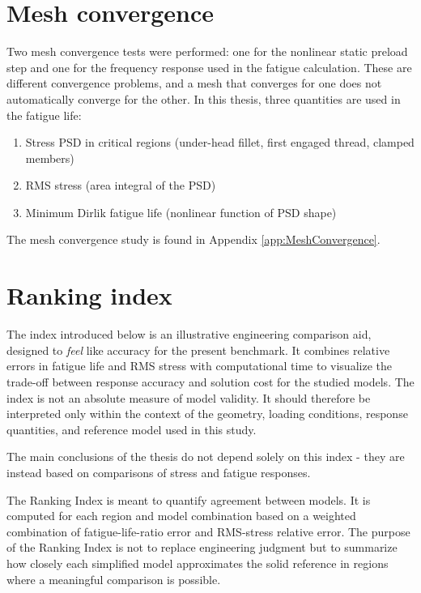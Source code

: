 \documentclass[a4paper,twoside]{bth}
\begin{document}
\section{Mesh convergence}
Two mesh convergence tests were performed: one for the nonlinear static preload step and one for the frequency response used in the fatigue calculation. These are different convergence problems, and a mesh that converges for one does not automatically converge for the other. In this thesis, three quantities are used in the fatigue life:
\begin{enumerate}
    \item Stress \ac{PSD} in critical regions (under-head fillet, first engaged thread, clamped members)
    \item \ac{RMS} stress (area integral of the \ac{PSD})
    \item Minimum Dirlik fatigue life (nonlinear function of \ac{PSD} shape)
\end{enumerate}

The mesh convergence study is found in Appendix \ref{app:MeshConvergence}.

\section{Ranking index}

The index introduced below is an illustrative engineering comparison aid, designed to \textit{feel} like accuracy for the present benchmark. It combines relative errors in fatigue life and \ac{RMS} stress with computational time to visualize the trade-off between response accuracy and solution cost for the studied models. The index is not an absolute measure of model validity. It should therefore be interpreted only within the context of the geometry, loading conditions, response quantities, and reference model used in this study.

The main conclusions of the thesis do not depend solely on this index - they are instead based on comparisons of stress and fatigue responses.

The Ranking Index is meant to quantify agreement between models. It is computed for each region and model combination based on a weighted combination of fatigue-life-ratio error and RMS-stress relative error. The purpose of the Ranking Index is not to replace engineering judgment but to summarize how closely each simplified model approximates the solid reference in regions where a meaningful comparison is possible.
\end{document}
